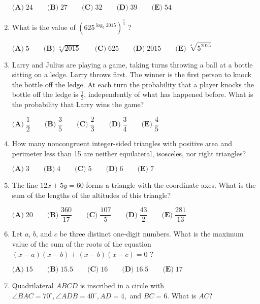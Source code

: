 \documentclass{article}
\begin{document}
\begin{enumerate}[label=\arabic*., itemsep=0.5em]
\(\textbf{(A)}\; 24 \qquad\textbf{(B)}\; 27 \qquad\textbf{(C)}\; 32 \qquad\textbf{(D)}\; 39 \qquad\textbf{(E)}\; 54\)\par \vspace{0.5em}\item What is the value of \((625^{\log_5 2015})^{\frac{1}{4}}\) ?

\(\textbf{(A)}\; 5 \qquad\textbf{(B)}\; \sqrt[4]{2015} \qquad\textbf{(C)}\; 625 \qquad\textbf{(D)}\; 2015 \qquad\textbf{(E)}\; \sqrt[4]{5^{2015}}\)\par \vspace{0.5em}\item Larry and Julius are playing a game, taking turns throwing a ball at a bottle sitting on a ledge. Larry throws first. The winner is the first person to knock the bottle off the ledge. At each turn the probability that a player knocks the bottle off the ledge is \(\tfrac{1}{2}\), independently of what has happened before. What is the probability that Larry wins the game?

\(\textbf{(A)}\; \dfrac{1}{2} \qquad\textbf{(B)}\; \dfrac{3}{5} \qquad\textbf{(C)}\; \dfrac{2}{3} \qquad\textbf{(D)}\; \dfrac{3}{4} \qquad\textbf{(E)}\; \dfrac{4}{5}\)\par \vspace{0.5em}\item How many noncongruent integer-sided triangles with positive area and perimeter less than 15 are neither equilateral, isosceles, nor right triangles?

\(\textbf{(A)}\; 3 \qquad\textbf{(B)}\; 4 \qquad\textbf{(C)}\; 5 \qquad\textbf{(D)}\; 6 \qquad\textbf{(E)}\; 7\)\par \vspace{0.5em}\item The line \(12x+5y=60\) forms a triangle with the coordinate axes. What is the sum of the lengths of the altitudes of this triangle?

\(\textbf{(A)}\; 20 \qquad\textbf{(B)}\; \dfrac{360}{17} \qquad\textbf{(C)}\; \dfrac{107}{5} \qquad\textbf{(D)}\; \dfrac{43}{2} \qquad\textbf{(E)}\; \dfrac{281}{13}\)\par \vspace{0.5em}\item Let \(a\), \(b\), and \(c\) be three distinct one-digit numbers. What is the maximum value of the sum of the roots of the equation \((x-a)(x-b)+(x-b)(x-c)=0\) ?

\(\textbf{(A)}\; 15 \qquad\textbf{(B)}\; 15.5 \qquad\textbf{(C)}\; 16 \qquad\textbf{(D)}\; 16.5 \qquad\textbf{(E)}\; 17\)\par \vspace{0.5em}\item Quadrilateral \(ABCD\) is inscribed in a circle with \(\angle BAC=70^{\circ}, \angle ADB=40^{\circ}, AD=4,\) and \(BC=6\). What is \(AC\)?


\end{enumerate}
\end{document}
